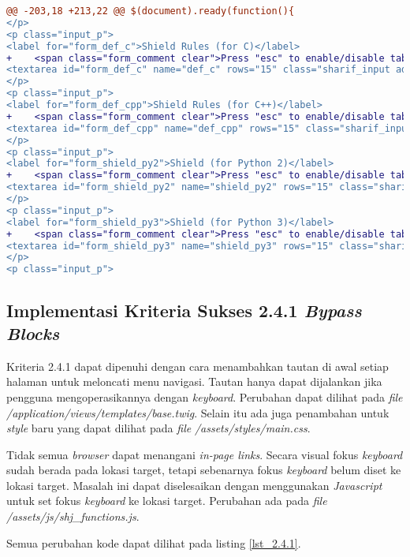 \begin{lstlisting}[language=diff, caption=Perubahan untuk mematuhi kriteria 2.1.2, label=lst_2.1.2, basicstyle=\ttfamily, frame=single,
columns=fullflexible, keepspaces=true, breaklines=true]
@@ -203,18 +213,22 @@ $(document).ready(function(){
</p>
<p class="input_p">
<label for="form_def_c">Shield Rules (for C)</label>
+    <span class="form_comment clear">Press "esc" to enable/disable tabindent</span><br>
<textarea id="form_def_c" name="def_c" rows="15" class="sharif_input add_text clear">{{ defc }}</textarea>
</p>
<p class="input_p">
<label for="form_def_cpp">Shield Rules (for C++)</label>
+    <span class="form_comment clear">Press "esc" to enable/disable tabindent</span><br>
<textarea id="form_def_cpp" name="def_cpp" rows="15" class="sharif_input add_text clear">{{ defcpp }}</textarea>
</p>
<p class="input_p">
<label for="form_shield_py2">Shield (for Python 2)</label>
+    <span class="form_comment clear">Press "esc" to enable/disable tabindent</span><br>
<textarea id="form_shield_py2" name="shield_py2" rows="15" class="sharif_input add_text clear">{{ shield_py2 }}</textarea>
</p>
<p class="input_p">
<label for="form_shield_py3">Shield (for Python 3)</label>
+    <span class="form_comment clear">Press "esc" to enable/disable tabindent</span><br>
<textarea id="form_shield_py3" name="shield_py3" rows="15" class="sharif_input add_text clear">{{ shield_py3 }}</textarea>
</p>
<p class="input_p">
\end{lstlisting}

\subsection{Implementasi Kriteria Sukses 2.4.1 \textit{Bypass Blocks}}
\label{subsec:implementasi_A_2.4.1}

Kriteria 2.4.1 dapat dipenuhi dengan cara menambahkan tautan di awal setiap halaman untuk meloncati menu navigasi. Tautan hanya dapat dijalankan jika pengguna mengoperasikannya dengan \textit{keyboard}. Perubahan dapat dilihat pada \textit{file} \textit{/application/views/templates/base.twig}. Selain itu ada juga penambahan untuk \textit{style} baru yang dapat dilihat pada \textit{file} \textit{/assets/styles/main.css}.

Tidak semua \textit{browser} dapat menangani \textit{in-page links}. Secara visual fokus \textit{keyboard} sudah berada pada lokasi target, tetapi sebenarnya fokus \textit{keyboard} belum diset ke lokasi target. Masalah ini dapat diselesaikan dengan menggunakan \textit{Javascript} untuk set fokus \textit{keyboard} ke lokasi target. Perubahan ada pada \textit{file} \textit{/assets/js/shj\_functions.js}.

Semua perubahan kode dapat dilihat pada listing \ref{lst_2.4.1}.

